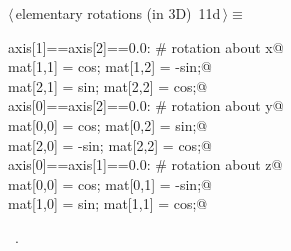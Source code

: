 \documentclass[11pt,oneside]{article}	%
\begin{document}
\begin{flushleft} \small \label{scrap24}
\protect{}$\langle\,$elementary rotations (in 3D)\nobreak\ {\footnotesize 11d}$\,\rangle\equiv$
\vspace{-1ex}
\begin{list}{}{} \item
\mbox{}\verb@if axis[1]==axis[2]==0.0:  # rotation about x@\\
\mbox{}\verb@   mat[1,1] = cos;   mat[1,2] = -sin;@\\
\mbox{}\verb@   mat[2,1] = sin;   mat[2,2] = cos;@\\
\mbox{}\verb@elif axis[0]==axis[2]==0.0:   # rotation about y@\\
\mbox{}\verb@   mat[0,0] = cos;   mat[0,2] = sin;@\\
\mbox{}\verb@   mat[2,0] = -sin;  mat[2,2] = cos;@\\
\mbox{}\verb@elif axis[0]==axis[1]==0.0:   # rotation about z@\\
\mbox{}\verb@   mat[0,0] = cos;   mat[0,1] = -sin;@\\
\mbox{}\verb@   mat[1,0] = sin;   mat[1,1] = cos;@\\
\mbox{}\verb@@{\NWsep}
\end{list}
\vspace{-1ex}
\footnotesize\addtolength{\baselineskip}{-1ex}
\begin{list}{}{\setlength{\itemsep}{-\parsep}\setlength{\itemindent}{-\leftmargin}}
\item \NWtxtMacroRefIn\ .
\end{list}
\end{flushleft}
\end{document}
